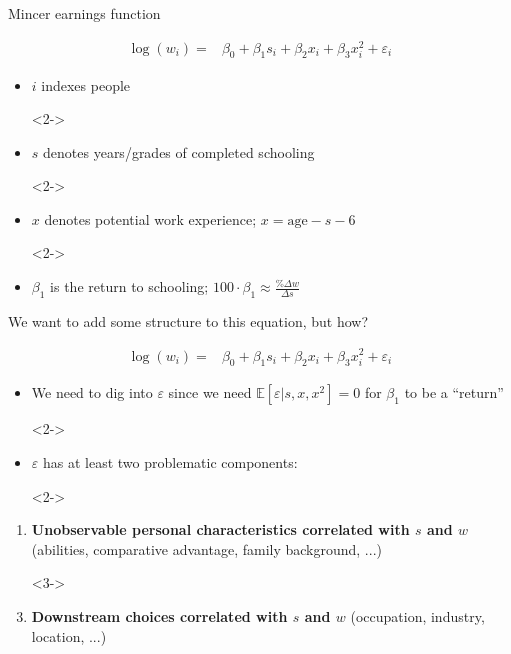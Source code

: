 \documentclass[aspectratio=169]{beamer}
\begin{document}
\begin{frame}
Mincer earnings function

\begin{align}
\log(w_{i}) =& \beta_0 + \beta_1 s_{i} + \beta_2 x_{i} + \beta_3 x^2_{i} + \varepsilon_{i}
\label{eq:basicmincer}
\end{align}

\begin{itemize}
    \item<2-> $i$ indexes people
    \item[]<2->
    \item<2-> $s$ denotes years/grades of completed schooling
    \item[]<2->
    \item<2-> $x$ denotes potential work experience; $x=\text{age}-s-6$
    \item[]<2->
    \item<2-> $\beta_1$ is the return to schooling; $100\cdot\beta_1\approx\frac{\%\Delta w}{\Delta s}$
\end{itemize}
\end{frame}


\begin{frame}
We want to add some structure to this equation, but how?

\begin{align*}
\log(w_{i}) =& \beta_0 + \beta_1 s_{i} + \beta_2 x_{i} + \beta_3 x^2_{i} + \varepsilon_{i}
\end{align*}

\begin{itemize}
    \item<2-> We need to dig into $\varepsilon$ since we need $\mathbb{E}[\varepsilon|s,x,x^2]=0$ for $\beta_1$ to be a ``return''
    \item[]<2->
    \item<2-> $\varepsilon$ has at least two problematic components:
    \item[]<2->
\end{itemize}

\begin{enumerate}
    \item<3-> \textbf{Unobservable personal characteristics correlated with $s$ and $w$} (abilities, comparative advantage, family background, ...)
    \item[]<3->
    \item<3-> \textbf{Downstream choices correlated with $s$ and $w$} (occupation, industry, location, ...)
\end{enumerate}

\end{frame}
\end{document}
